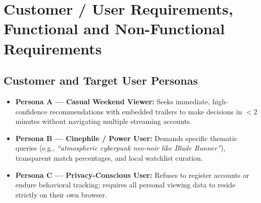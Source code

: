 \documentclass[11pt,a4paper]{article}
\begin{document}
\section{Customer / User Requirements, Functional and Non-Functional Requirements}

\subsection{Customer and Target User Personas}
\begin{itemize}[leftmargin=*]
    \item \textbf{Persona A --- Casual Weekend Viewer:} Seeks immediate, high-confidence recommendations with embedded trailers to make decisions in $< 2$ minutes without navigating multiple streaming accounts.
    \item \textbf{Persona B --- Cinephile / Power User:} Demands specific thematic queries (e.g., \textit{``atmospheric cyberpunk neo-noir like Blade Runner''}), transparent match percentages, and local watchlist curation.
    \item \textbf{Persona C --- Privacy-Conscious User:} Refuses to register accounts or endure behavioral tracking; requires all personal viewing data to reside strictly on their own browser.
\end{itemize}
\end{document}

